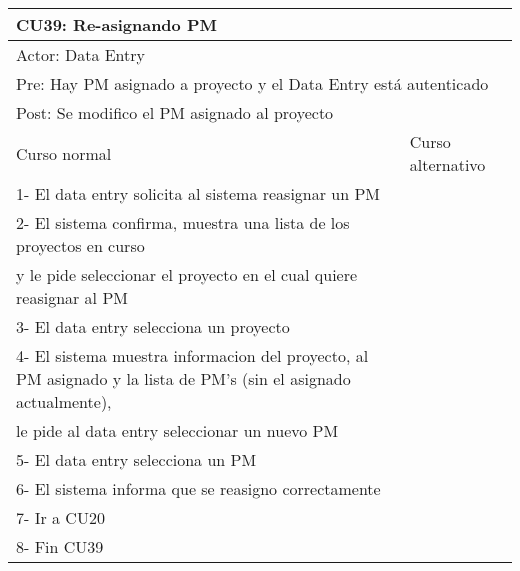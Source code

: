 \begin{table}[H]
  \begin{adjustbox}{max width = \textwidth}
  \begin{tabular}{|l|l|}
    \hline
    \multicolumn{2}{|l|}{CU39: Re-asignando PM} \\\hline
    \multicolumn{2}{|l|}{Actor: Data Entry} \\\hline
    \multicolumn{2}{|l|}{Pre: Hay PM asignado a proyecto y el Data Entry está autenticado} \\\hline
    \multicolumn{2}{|l|}{Post: Se modifico el PM asignado al proyecto} \\\hline
     Curso normal & Curso alternativo\\ \hline
	 1- El data entry solicita al sistema reasignar un PM & \\ \hline
	 2- El sistema confirma, muestra una lista de los proyectos en curso \\ y le pide seleccionar el proyecto en el cual quiere reasignar al PM & \\ \hline
	 3- El data entry selecciona un proyecto & \\ \hline
     4- El sistema muestra informacion del proyecto, al PM asignado y la lista de PM's (sin el asignado actualmente), \\ le pide al data entry seleccionar un nuevo PM & \\ \hline
     5- El data entry selecciona un PM & \\ \hline
	 6- El sistema informa que se reasigno correctamente & \\ \hline
     7- Ir a CU20 & \\ \hline
     8- Fin CU39 & \\ \hline
  \end{tabular}
  \end{adjustbox}
\end{table}


